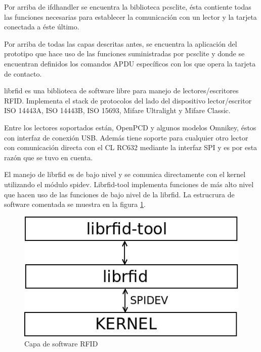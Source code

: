 \documentclass[%
        final,
        notitlepage,
        narroweqnarray,
        inline,
        ]{ieee}
\begin{document}
Por arriba de ifdhandler se encuentra la biblioteca pcsclite, ésta contiente todas las funciones necesarias para establecer la comunicación con un lector y la tarjeta conectada a éste último.


Por arriba de todas las capas descritas antes, se encuentra la aplicación del prototipo que hace uso de las funciones suministradas por pcsclite y donde se encuentran definidos los comandos APDU específicos con los que opera la tarjeta de contacto.


librfid es una biblioteca de software libre para manejo de lectores/escritores RFID. Implementa el stack de protocolos del lado del dispositivo lector/escritor ISO 14443A, ISO 14443B, ISO 15693, Mifare Ultralight y Mifare Classic.

Entre los lectores soportados están, OpenPCD y algunos modelos Omnikey, éstos con interfaz de conexión USB. Además tiene soporte para cualquier otro lector con comunicación directa con el CL RC632 mediante la interfaz SPI y es por esta razón que se tuvo en cuenta.

El manejo de librfid es de bajo nivel y se comunica directamente con el kernel utilizando el módulo spidev. Librfid-tool implementa funciones de más alto nivel que hacen uso de las funciones de bajo nivel de la librfid. La estrucrura de software comentada se muestra en la figura \ref{sw_RFID}.

\begin{figure}[h]
\centering
  \begin{center}
  \includegraphics[scale=.4]{../docs/Imagenes/librfid-tool.jpg} 
  \end{center}
  \caption{Capa de software RFID}\label{sw_RFID} 
\end{figure}
\end{document}
